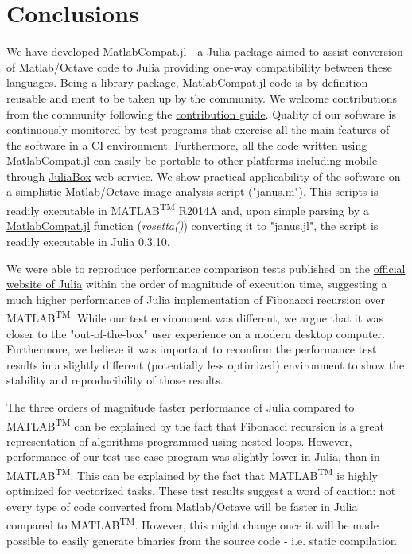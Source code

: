 \section{Conclusions}

We have developed \href{https://github.com/MatlabCompat/MatlabCompat.jl}{MatlabCompat.jl} - a Julia package aimed to assist conversion of Matlab/Octave code to Julia providing one-way compatibility between these languages. Being a library package, \href{https://github.com/MatlabCompat/MatlabCompat.jl}{MatlabCompat.jl} code is by definition reusable and ment to be taken up by the community. We welcome contributions from the community following the \href{http://matlabcompat.github.io/contribute.html}{contribution guide}. Quality of our software is continuously monitored by test programs that exercise all the main features of the software in a CI environment. Furthermore, all the code written using \href{https://github.com/MatlabCompat/MatlabCompat.jl}{MatlabCompat.jl} can easily be portable to other platforms including mobile through \href{https://www.juliabox.org/}{JuliaBox} web service. We show practical applicability of the software on a simplistic Matlab/Octave image analysis script ("janus.m"). This scripts is readily executable in MATLAB\textsuperscript{TM} R2014A and, upon simple parsing by a \href{https://github.com/MatlabCompat/MatlabCompat.jl}{MatlabCompat.jl} function (\textit{rosetta()}) converting it to "janus.jl", the script is readily executable in Julia 0.3.10.

We were able to reproduce performance comparison tests published on the \href{http://julialang.org/benchmarks/}{official website of Julia} within the order of magnitude of execution time, suggesting a much higher performance of Julia implementation of Fibonacci recursion over MATLAB\textsuperscript{TM}. While our test environment was different, we argue that it was closer to the "out-of-the-box" user experience on a modern desktop computer. Furthermore, we believe it was important to reconfirm the performance test results in a slightly different (potentially less optimized) environment to show the stability and reproducibility of those results.

The three orders of magnitude faster performance of Julia compared to MATLAB\textsuperscript{TM} can be explained by the fact that Fibonacci recursion is a great representation of algorithms programmed using nested loops. However, performance of our test use case program was slightly lower in Julia, than in MATLAB\textsuperscript{TM}. This can be explained by the fact that MATLAB\textsuperscript{TM} is highly optimized for vectorized tasks. These test results suggest a word of caution: not every type of code converted from Matlab/Octave will be faster in Julia compared to MATLAB\textsuperscript{TM}. However, this might change once it will be made possible to easily generate binaries from the source code - i.e. static compilation.

